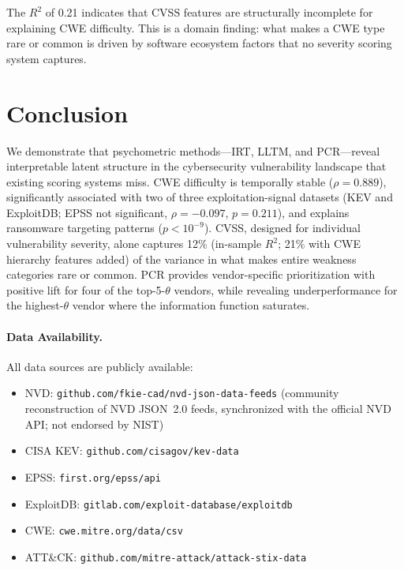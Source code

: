 \documentclass[11pt,a4paper]{article}
\begin{document}
The $R^2$ of 0.21 indicates that CVSS features are structurally incomplete for explaining CWE difficulty.
This is a domain finding: what makes a CWE type rare or common is driven by software ecosystem factors that no severity scoring system captures.

\section{Conclusion}

We demonstrate that psychometric methods---IRT, LLTM, and PCR---reveal interpretable latent structure in the cybersecurity vulnerability landscape that existing scoring systems miss.
CWE difficulty is temporally stable ($\rho = 0.889$), significantly associated with two of three exploitation-signal datasets (KEV and ExploitDB; EPSS not significant, $\rho = -0.097$, $p = 0.211$), and explains ransomware targeting patterns ($p < 10^{-9}$).
CVSS, designed for individual vulnerability severity, alone captures 12\% (in-sample $R^2$; 21\% with CWE hierarchy features added) of the variance in what makes entire weakness categories rare or common.
PCR provides vendor-specific prioritization with positive lift for four of the top-5-$\theta$ vendors, while revealing underperformance for the highest-$\theta$ vendor where the information function saturates.

\paragraph{Data Availability.}
All data sources are publicly available:
\begin{itemize}\setlength{\itemsep}{0pt}\setlength{\parskip}{0pt}
\item NVD: \texttt{github.com/fkie-cad/nvd-json-data-feeds} (community reconstruction of NVD JSON~2.0 feeds, synchronized with the official NVD API; not endorsed by NIST)
\item CISA KEV: \texttt{github.com/cisagov/kev-data}
\item EPSS: \texttt{first.org/epss/api}
\item ExploitDB: \texttt{gitlab.com/exploit-database/exploitdb}
\item CWE: \texttt{cwe.mitre.org/data/csv}
\item ATT\&CK: \texttt{github.com/mitre-attack/attack-stix-data}
\end{itemize}
\end{document}
